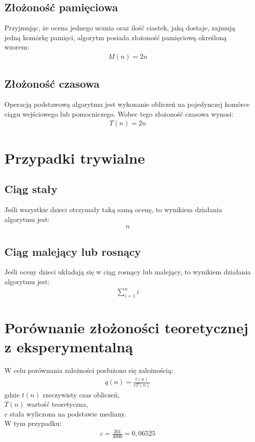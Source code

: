 \documentclass{article}
\begin{document}
	\subsection{Złożoność pamięciowa}
	Przyjmując, że ocena jednego ucznia oraz ilość ciastek, jaką dostaje, zajmują jedną komórkę pamięci, algorytm posiada złożoność pamięciową określoną wzorem:
	\begin{align*}
		M(n) = 2n
	\end{align*}

	\subsection{Złożoność czasowa}
	Operacją podstawową algorytmu jest wykonanie obliczeń na pojedynczej komórce ciągu wejściowego lub pomocniczego. Wobec tego złożoność czasowa wynosi:
	\begin{align*}
		T(n) = 2n
	\end{align*}


	\section{Przypadki trywialne}

	\subsection{Ciąg stały}

	Jeśli wszystkie dzieci otrzymały taką samą ocenę, to wynikiem działania algorytmu jest:
	\begin{align*}
		n
	\end{align*}

	\subsection{Ciąg malejący lub rosnący}

	Jeśli oceny dzieci układają się w ciąg rosnący lub malejący, to wynikiem działania algorytmu jest:
	\begin{align*}
		\displaystyle\sum_{i=1}^{n} i
	\end{align*}

	\section{Porównanie złożoności teoretycznej z eksperymentalną}
	W celu porównania zależności posłużono się zależnością:
	\begin{align*}
		q(n) = \frac{t(n)}{cT(n)}
	\end{align*}
	gdzie $t(n)$ rzeczywisty czas obliczeń, \\
	$T(n)$ wartość teoretyczna, \\
	$c$ stała wyliczona na podstawie mediany. \\
	W tym przypadku:
	\begin{align*}
		c = \frac{261}{4000} = 0,06525
	\end{align*}
\end{document}
